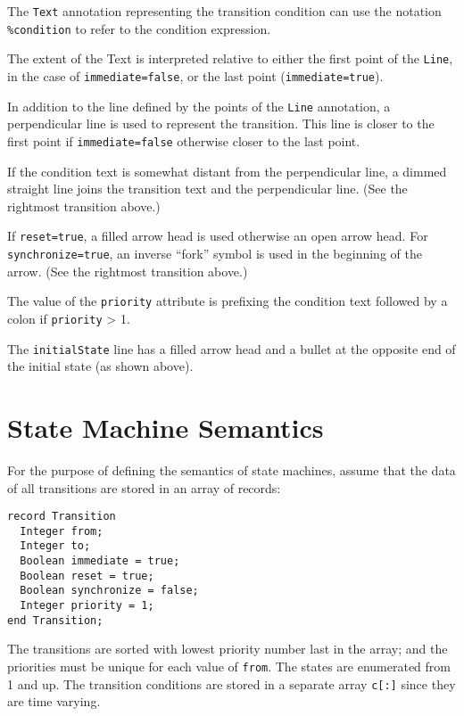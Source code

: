 The \lstinline!Text! annotation representing the transition condition can use the notation \lstinline!%condition! to refer to the condition expression.

The extent of the Text is interpreted relative to either the first point of the \lstinline!Line!, in the case of \lstinline!immediate=false!, or the last point (\lstinline!immediate=true!).

In addition to the line defined by the points of the \lstinline!Line! annotation, a perpendicular line is used to represent the transition.  This line is closer to the first point if \lstinline!immediate=false! otherwise closer to the last point.

If the condition text is somewhat distant from the perpendicular line, a dimmed straight line joins the transition text and the perpendicular line.  (See the rightmost transition above.)

If \lstinline!reset=true!, a filled arrow head is used otherwise an open arrow head.
For \lstinline!synchronize=true!, an inverse ``fork'' symbol is used in the
beginning of the arrow.  (See the rightmost transition above.)

The value of the \lstinline!priority! attribute is prefixing the condition text
followed by a colon if \lstinline!priority! \textgreater{} 1.

The \lstinline!initialState! line has a filled arrow head and a bullet at the
opposite end of the initial state (as shown above).

\section{State Machine Semantics}\label{state-machine-semantics}

For the purpose of defining the semantics of state machines, assume that
the data of all transitions are stored in an array of records:
\begin{lstlisting}[language=modelica]
record Transition
  Integer from;
  Integer to;
  Boolean immediate = true;
  Boolean reset = true;
  Boolean synchronize = false;
  Integer priority = 1;
end Transition;
\end{lstlisting}

The transitions are sorted with lowest priority number last in the
array; and the priorities must be unique for each value of \lstinline!from!. The
states are enumerated from 1 and up. The transition conditions are
stored in a separate array \lstinline!c[:]! since they are time varying.

